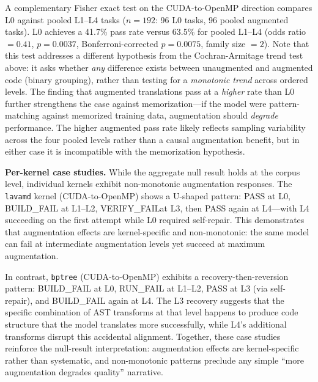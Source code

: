 \documentclass{article}
\newcommand{\buildfail}{\textsc{BUILD\_FAIL}}
\newcommand{\runfail}{\textsc{RUN\_FAIL}}
\newcommand{\verifyfail}{\textsc{VERIFY\_FAIL}}
\begin{document}
A complementary Fisher exact test on the CUDA-to-OpenMP direction compares L0 against pooled L1--L4 tasks ($n = 192$: 96 L0 tasks, 96 pooled augmented tasks). L0 achieves a 41.7\% pass rate versus 63.5\% for pooled L1--L4 (odds ratio $= 0.41$, $p = 0.0037$, Bonferroni-corrected $p = 0.0075$, family size $= 2$). Note that this test addresses a different hypothesis from the Cochran-Armitage trend test above: it asks whether \emph{any} difference exists between unaugmented and augmented code (binary grouping), rather than testing for a \emph{monotonic trend} across ordered levels. The finding that augmented translations pass at a \emph{higher} rate than L0 further strengthens the case against memorization---if the model were pattern-matching against memorized training data, augmentation should \emph{degrade} performance. The higher augmented pass rate likely reflects sampling variability across the four pooled levels rather than a causal augmentation benefit, but in either case it is incompatible with the memorization hypothesis.

\textbf{Per-kernel case studies.} While the aggregate null result holds at the corpus level, individual kernels exhibit non-monotonic augmentation responses. The \texttt{lavamd} kernel (CUDA-to-OpenMP) shows a U-shaped pattern: PASS at L0, \buildfail{} at L1--L2, \verifyfail at L3, then PASS again at L4---with L4 succeeding on the first attempt while L0 required self-repair. This demonstrates that augmentation effects are kernel-specific and non-monotonic: the same model can fail at intermediate augmentation levels yet succeed at maximum augmentation.

In contrast, \texttt{bptree} (CUDA-to-OpenMP) exhibits a recovery-then-reversion pattern: \buildfail{} at L0, \runfail{} at L1--L2, PASS at L3 (via self-repair), and \buildfail{} again at L4. The L3 recovery suggests that the specific combination of AST transforms at that level happens to produce code structure that the model translates more successfully, while L4's additional transforms disrupt this accidental alignment. Together, these case studies reinforce the null-result interpretation: augmentation effects are kernel-specific rather than systematic, and non-monotonic patterns preclude any simple ``more augmentation degrades quality'' narrative.
\end{document}
